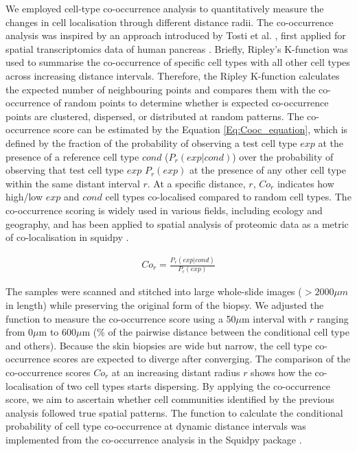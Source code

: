 We employed cell-type co-occurrence analysis to quantitatively measure the changes in cell localisation through different distance radii. The co-occurrence analysis was inspired by an approach introduced by Tosti et al. \cite{tosti2021single}, first applied for spatial transcriptomics data of human pancreas \cite{tosti2021single}. Briefly, Ripley's K-function was used to summarise the co-occurrence of specific cell types with all other cell types across increasing distance intervals. Therefore, the Ripley K-function calculates the expected number of neighbouring points and compares them with the co-occurrence of random points to determine whether is expected co-occurrence points are clustered, dispersed, or distributed at random patterns. The co-occurrence score can be estimated by the Equation \ref{Eq:Cooc_equation}, which is defined by the fraction of the probability of observing a test cell type $exp$ at the presence of a reference cell type $cond$ ($P_{r}(exp|cond)$) over the probability of observing that test cell type $exp$ $P_{r}(exp)$ at the presence of any other cell type within the same distant interval $r$. At a specific distance, $r$, $Co_{r}$ indicates how high/low $exp$ and $cond$ cell types co-localised compared to random cell types. The co-occurrence scoring is widely used in various fields, including ecology and geography, and has been applied to spatial analysis of proteomic data as a metric of co-localisation in squidpy \cite{palla2022squidpy}. 

\begin{align}
\label{Eq:Cooc_equation}
Co_{r} = \frac{P_{r}(exp|cond)}{P_{r}(exp)} 
\end{align}

 The samples were scanned and stitched into large whole-slide images ($>2000 \mu m$ in length) while preserving the original form of the biopsy. We adjusted the function to measure the co-occurrence score using a 50$\mu$m interval with $r$ ranging from 0$\mu$m to 600$\mu$m (\% of the pairwise distance between the conditional cell type and others). Because the skin biopsies are wide but narrow, the cell type co-occurrence scores are expected to diverge after converging. The comparison of the co-occurrence scores $Co_{r}$ at an increasing distant radius $r$ shows how the co-localisation of two cell types starts dispersing. By applying the co-occurrence score, we aim to ascertain whether cell communities identified by the previous analysis followed true spatial patterns. The function to calculate the conditional probability of cell type co-occurrence at dynamic distance intervals was implemented from the co-occurrence analysis in the Squidpy package \cite{palla2022squidpy}.

